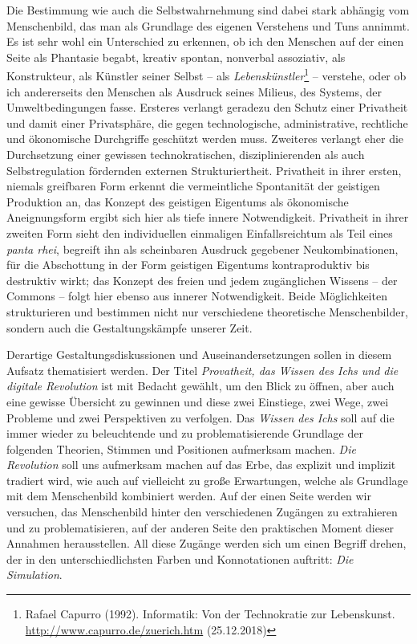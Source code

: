 \documentclass[12pt,a4paper]{article}
\begin{document}
Die Bestimmung wie auch die Selbstwahrnehmung sind dabei stark abhängig vom
Menschenbild, das man als Grundlage des eigenen Verstehens und Tuns annimmt.
Es ist sehr wohl ein Unterschied zu erkennen, ob ich den Menschen auf der
einen Seite als Phantasie begabt, kreativ spontan, nonverbal assoziativ, als
Konstrukteur, als Künstler seiner Selbst -- als
\emph{Lebenskünstler}\footnote{Rafael Capurro (1992). Informatik: Von der
  Technokratie zur Lebenskunst. \url{http://www.capurro.de/zuerich.htm}
  (25.12.2018)} -- verstehe, oder ob ich andererseits den Menschen als
Ausdruck seines Milieus, des Systems, der Umweltbedingungen fasse. Ersteres
verlangt geradezu den Schutz einer Privatheit und damit einer Privatsphäre,
die gegen technologische, administrative, rechtliche und ökonomische
Durchgriffe geschützt werden muss. Zweiteres verlangt eher die Durchsetzung
einer gewissen technokratischen, disziplinierenden als auch Selbstregulation
fördernden externen Strukturiertheit. Privatheit in ihrer ersten, niemals
greifbaren Form erkennt die vermeintliche Spontanität der geistigen Produktion
an, das Konzept des geistigen Eigentums als ökonomische Aneignungsform ergibt
sich hier als tiefe innere Notwendigkeit. Privatheit in ihrer zweiten Form
sieht den individuellen einmaligen Einfallsreichtum als Teil eines \emph{panta
  rhei}, begreift ihn als scheinbaren Ausdruck gegebener Neukombinationen, für
die Abschottung in der Form geistigen Eigentums kontraproduktiv bis destruktiv
wirkt; das Konzept des freien und jedem zugänglichen Wissens -- der Commons --
folgt hier ebenso aus innerer Notwendigkeit. Beide Möglichkeiten strukturieren
und bestimmen nicht nur verschiedene theoretische Menschenbilder, sondern auch
die Gestaltungskämpfe unserer Zeit.

Derartige Gestaltungsdiskussionen und Auseinandersetzungen sollen in diesem
Aufsatz thematisiert werden.  Der Titel \emph{Provatheit, das Wissen des Ichs
  und die digitale Revolution} ist mit Bedacht gewählt, um den Blick zu
öffnen, aber auch eine gewisse Übersicht zu gewinnen und diese zwei Einstiege,
zwei Wege, zwei Probleme und zwei Perspektiven zu verfolgen. Das \emph{Wissen
  des Ichs} soll auf die immer wieder zu beleuchtende und zu
problematisierende Grundlage der folgenden Theorien, Stimmen und Positionen
aufmerksam machen. \emph{Die Revolution} soll uns aufmerksam machen auf das
Erbe, das explizit und implizit tradiert wird, wie auch auf vielleicht zu
große Erwartungen, welche als Grundlage mit dem Menschenbild kombiniert
werden. Auf der einen Seite werden wir versuchen, das Menschenbild hinter den
verschiedenen Zugängen zu extrahieren und zu problematisieren, auf der anderen
Seite den praktischen Moment dieser Annahmen herausstellen. All diese Zugänge
werden sich um einen Begriff drehen, der in den unterschiedlichsten Farben und
Konnotationen auftritt: \emph{Die Simulation}.
\end{document}
